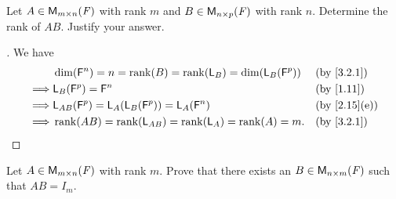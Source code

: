 \begin{ex}\label{ex:3.2.19}
	Let \(A \in \MS\) with rank \(m\) and \(B \in \ms[n][p][\F]\) with rank \(n\).
	Determine the rank of \(AB\).
	Justify your answer.
\end{ex}

\begin{proof}[]
	We have
	\begin{align*}
		         & \dim(\vs{F}^n) = n = \rk{B} = \rk{\L_B} = \dim(\L_B(\vs{F}^p)) &  & \by{3.2.1}   \\
		\implies & \L_B(\vs{F}^p) = \vs{F}^n                                      &  & \by{1.11}    \\
		\implies & \L_{AB}(\vs{F}^p) = \L_A(\L_B(\vs{F}^p)) = \L_A(\vs{F}^n)      &  & \by{2.15}[e] \\
		\implies & \rk{AB} = \rk{\L_{AB}} = \rk{\L_A} = \rk{A} = m.               &  & \by{3.2.1}
	\end{align*}
\end{proof}

\setcounter{ex}{20}
\begin{ex}\label{ex:3.2.21}
	Let \(A \in \MS\) with rank \(m\).
	Prove that there exists an \(B \in \ms[n][m][\F]\) such that \(AB = I_m\).
\end{ex}


